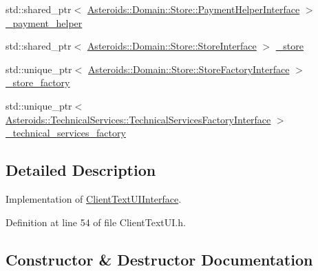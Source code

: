 \begin{DoxyCompactItemize}
\item 
std\+::shared\+\_\+ptr$<$ \hyperlink{classAsteroids_1_1Domain_1_1Store_1_1PaymentHelperInterface}{Asteroids\+::\+Domain\+::\+Store\+::\+Payment\+Helper\+Interface} $>$ \hyperlink{classAsteroids_1_1UI_1_1ClientTextUI_1_1ClientTextUI_a336c11e361de184974f409b5a95fff6a}{\+\_\+payment\+\_\+helper}
\item 
std\+::shared\+\_\+ptr$<$ \hyperlink{classAsteroids_1_1Domain_1_1Store_1_1StoreInterface}{Asteroids\+::\+Domain\+::\+Store\+::\+Store\+Interface} $>$ \hyperlink{classAsteroids_1_1UI_1_1ClientTextUI_1_1ClientTextUI_a8a1942977eefbdb5b04a63bfca67379f}{\+\_\+store}
\item 
std\+::unique\+\_\+ptr$<$ \hyperlink{classAsteroids_1_1Domain_1_1Store_1_1StoreFactoryInterface}{Asteroids\+::\+Domain\+::\+Store\+::\+Store\+Factory\+Interface} $>$ \hyperlink{classAsteroids_1_1UI_1_1ClientTextUI_1_1ClientTextUI_a29fb41eef3f766c841dce3b6cfa801a1}{\+\_\+store\+\_\+factory}
\item 
std\+::unique\+\_\+ptr$<$ \hyperlink{classAsteroids_1_1TechnicalServices_1_1TechnicalServicesFactoryInterface}{Asteroids\+::\+Technical\+Services\+::\+Technical\+Services\+Factory\+Interface} $>$ \hyperlink{classAsteroids_1_1UI_1_1ClientTextUI_1_1ClientTextUI_a52e7ca578c973a1c686de71abe86f0ad}{\+\_\+technical\+\_\+services\+\_\+factory}
\end{DoxyCompactItemize}


\subsection{Detailed Description}
Implementation of \hyperlink{classAsteroids_1_1UI_1_1ClientTextUI_1_1ClientTextUIInterface}{Client\+Text\+U\+I\+Interface}. 

Definition at line 54 of file Client\+Text\+U\+I.\+h.



\subsection{Constructor \& Destructor Documentation}
\mbox{\label{classAsteroids_1_1UI_1_1ClientTextUI_1_1ClientTextUI_aec13a3cf71cb24f12d9c9b44066e1243}} 

